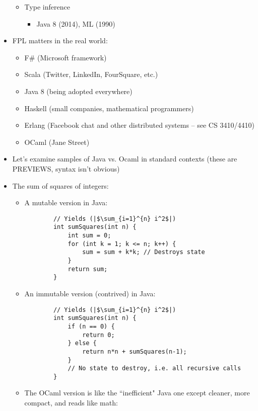 \begin{itemize}
\begin{itemize}
\begin{itemize}
        \end{itemize}
        \item Type inference
        \begin{itemize}
            \item \textsf{Java 8} (2014), \textsf{ML} (1990)
        \end{itemize}
    \end{itemize}
    \item FPL matters in the real world:
    \begin{itemize}
        \item \textsf{F\#} (Microsoft framework)
        \item \textsf{Scala} (Twitter, LinkedIn, FourSquare, etc.)
        \item \textsf{Java 8} (being adopted everywhere)
        \item \textsf{Haskell} (small companies, mathematical programmers)
        \item \textsf{Erlang} (Facebook chat and other distributed systems -- see CS 3410/4410)
        \item \textsf{OCaml} (Jane Street)
    \end{itemize}
    \item Let's examine samples of \textsf{Java} vs. \textsf{Ocaml} in standard contexts (these are PREVIEWS, syntax isn't obvious)
    \item The sum of squares of integers:
    \begin{itemize}
    \item A mutable version in \textsf{Java}:
    \java
    \begin{lstlisting}
        // Yields (|$\sum_{i=1}^{n} i^2$|)
        int sumSquares(int n) {
            int sum = 0;
            for (int k = 1; k <= n; k++) {
                sum = sum + k*k; // Destroys state
            }
            return sum;
        }
    \end{lstlisting}
    \item An immutable version (contrived) in \textsf{Java}:
    \begin{lstlisting}
        // Yields (|$\sum_{i=1}^{n} i^2$|)
        int sumSquares(int n) {
            if (n == 0) {
                return 0;
            } else {
                return n*n + sumSquares(n-1);
            }
            // No state to destroy, i.e. all recursive calls
        }
    \end{lstlisting}
    \item The \textsf{OCaml} version is like the ``inefficient" \textsf{Java} one except cleaner, more compact, and reads like math:

\end{itemize}
\end{itemize}
